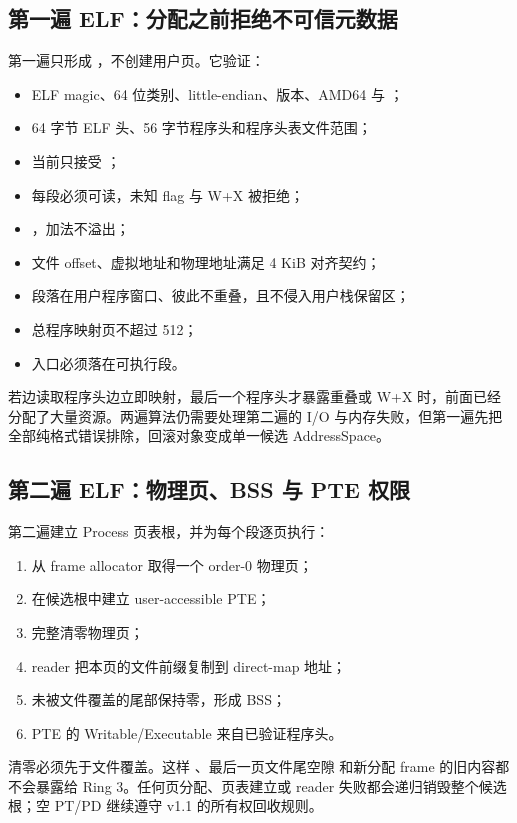 \subsection{第一遍 ELF：分配之前拒绝不可信元数据}

第一遍只形成 ，不创建用户页。它验证：

\begin{itemize}
  \item ELF magic、64 位类别、little-endian、版本、AMD64 与 ；
  \item 64 字节 ELF 头、56 字节程序头和程序头表文件范围；
  \item 当前只接受 ；
  \item 每段必须可读，未知 flag 与 W+X 被拒绝；
  \item {}，加法不溢出；
  \item 文件 offset、虚拟地址和物理地址满足 4 KiB 对齐契约；
  \item 段落在用户程序窗口、彼此不重叠，且不侵入用户栈保留区；
  \item 总程序映射页不超过 512；
  \item 入口必须落在可执行段。
\end{itemize}

若边读取程序头边立即映射，最后一个程序头才暴露重叠或 W+X 时，前面已经
分配了大量资源。两遍算法仍需要处理第二遍的 I/O 与内存失败，但第一遍先把
全部纯格式错误排除，回滚对象变成单一候选 AddressSpace。

\subsection{第二遍 ELF：物理页、BSS 与 PTE 权限}

第二遍建立 Process 页表根，并为每个段逐页执行：

\begin{enumerate}
  \item 从 frame allocator 取得一个 order-0 物理页；
  \item 在候选根中建立 user-accessible PTE；
  \item 完整清零物理页；
  \item reader 把本页的文件前缀复制到 direct-map 地址；
  \item 未被文件覆盖的尾部保持零，形成 BSS；
  \item PTE 的 Writable/Executable 来自已验证程序头。
\end{enumerate}

清零必须先于文件覆盖。这样 、最后一页文件尾空隙
和新分配 frame 的旧内容都不会暴露给 Ring 3。任何页分配、页表建立或 reader
失败都会递归销毁整个候选根；空 PT/PD 继续遵守 v1.1 的所有权回收规则。

